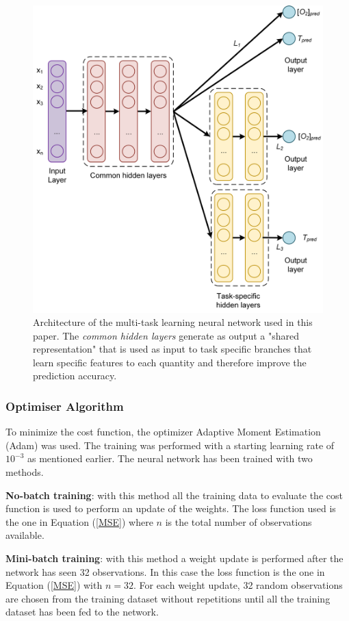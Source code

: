 \documentclass[9pt,twocolumn,twoside,pdftex]{optica}
\begin{document}
\begin{figure}[htbp]
\centering
\includegraphics[width=8.7 cm]{NN_MTL_O2_T.png}
\caption{Architecture of the multi-task learning neural network used in this paper. The {\sl common hidden layers} generate as output a "shared representation" that is used as input to task specific branches that learn specific features to each quantity and therefore improve the prediction accuracy. } 
\label{fig:NN_MTL_O2_T}
\end{figure}


\subsubsection{Optimiser Algorithm}

To minimize the cost function, the optimizer Adaptive Moment Estimation (Adam) \cite{Kingma2014, Michelucci2017} was used. The training was performed with a starting learning rate of $10^{-3}$ as mentioned earlier. The neural network has been trained with two methods. 

{\bf No-batch training}:
with this method all the training data to evaluate the cost function is used to perform an update of the weights. The loss function used is the one in Equation (\ref{MSE}) where $n$ is the total number of observations available.

{\bf Mini-batch training}:
with this method a weight update is performed after the network has seen 32 observations. In this case the loss function is the one in Equation (\ref{MSE}) with $n=32$. For each weight update, 32 random observations are chosen from the training dataset without repetitions until all the training dataset has been fed to the network.  
\end{document}
